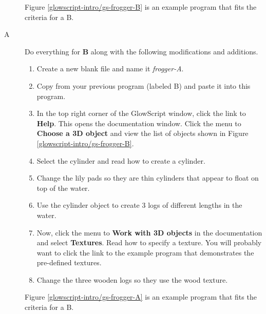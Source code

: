 \begin{description}
Figure \ref{glowscript-intro/gs-frogger-B} is an example program that fits the criteria for a B.



\item[A] Do everything for {\bf B} along with the following modifications and additions.

\begin{enumerate}
	\item Create a new blank file and name it \emph{frogger-A}. 
	\item Copy from your previous program (labeled B) and paste it into this program.
	\item In the top right corner of the GlowScript window, click the link to {\bf Help}. This opens the documentation window. Click the menu to {\bf Choose a 3D object} and view the list of objects shown in Figure \ref{glowscript-intro/gs-frogger-B}.


	\item Select the cylinder and read how to create a cylinder.
	
	\item Change the lily pads so they are thin cylinders that appear to float on top of the water.
	
	\item Use the cylinder object to create 3 logs of different lengths in the water.
	
	\item Now, click the menu to {\bf Work with 3D objects} in the documentation and select {\bf Textures}. Read how to specify a texture. You will probably want to click the link to the example program that demonstrates the pre-defined textures.
	
	\item Change the three wooden logs so they use the wood texture.

\end{enumerate}

Figure \ref{glowscript-intro/gs-frogger-A} is an example program that fits the criteria for a B.





\end{description}

